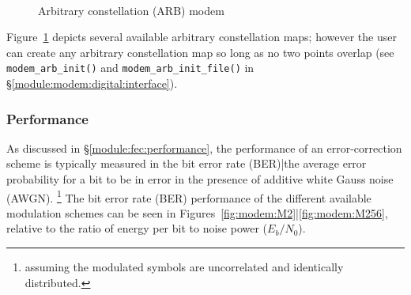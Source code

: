 %
\begin{figure}
\centering
\mbox{
   \quad
   \quad
}
\mbox{
   \quad
   \quad
}
\caption{Arbitrary constellation (ARB) modem}
\label{fig:modem:arb}
\end{figure}
%
Figure~\ref{fig:modem:arb} depicts several available arbitrary
constellation maps;
however the user can create any arbitrary constellation map so long as
no two points overlap
(see {\tt modem\_arb\_init()} and {\tt modem\_arb\_init\_file()} in
\S\ref{module:modem:digital:interface}).

\subsubsection{Performance}
\label{module:modem:digital:performance}

As discussed in \S\ref{module:fec:performance},
the performance of an error-correction scheme is typically measured in
the bit error rate (BER)|the average error probability for a bit to be
in error in the presence of additive white Gauss noise (AWGN).%
\footnote{assuming the modulated symbols are uncorrelated and
          identically distributed.}
The bit error rate (BER) performance of the different available
modulation schemes can be seen in
Figures~\ref{fig:modem:M2}|\ref{fig:modem:M256}, relative to the ratio
of energy per bit to noise power ($E_b/N_0$).

